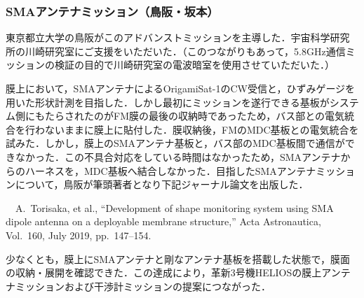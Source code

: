 \subsubsection{SMAアンテナミッション（鳥阪・坂本）}

東京都立大学の鳥阪がこのアドバンストミッションを主導した．宇宙科学研究所の川崎研究室にご支援をいただいた．（このつながりもあって，5.8GHz通信ミッションの検証の目的で川崎研究室の電波暗室を使用させていただいた．）

膜上において，SMAアンテナによるOrigamiSat-1のCW受信と，ひずみゲージを用いた形状計測を目指した．しかし最初にミッションを遂行できる基板がシステム側にもたらされたのがFM膜の最後の収納時であったため，バス部との電気統合を行わないままに膜上に貼付した．膜収納後，FMのMDC基板との電気統合を試みた．しかし，膜上のSMAアンテナ基板と，バス部のMDC基板間で通信ができなかった．この不具合対応をしている時間はなかったため，SMAアンテナからのハーネスを，MDC基板へ結合しなかった．目指したSMAアンテナミッションについて，鳥阪が筆頭著者となり下記ジャーナル論文を出版した．

\noindent　A.~Torisaka, et al., ``Development of shape monitoring system using SMA dipole antenna on a deployable membrane structure,'' Acta Astronautica, Vol.~160, July 2019, pp.~147--154.

少なくとも，膜上にSMAアンテナと剛なアンテナ基板を搭載した状態で，膜面の収納・展開を確認できた．この達成により，革新3号機HELIOSの膜上アンテナミッションおよび干渉計ミッションの提案につながった．



